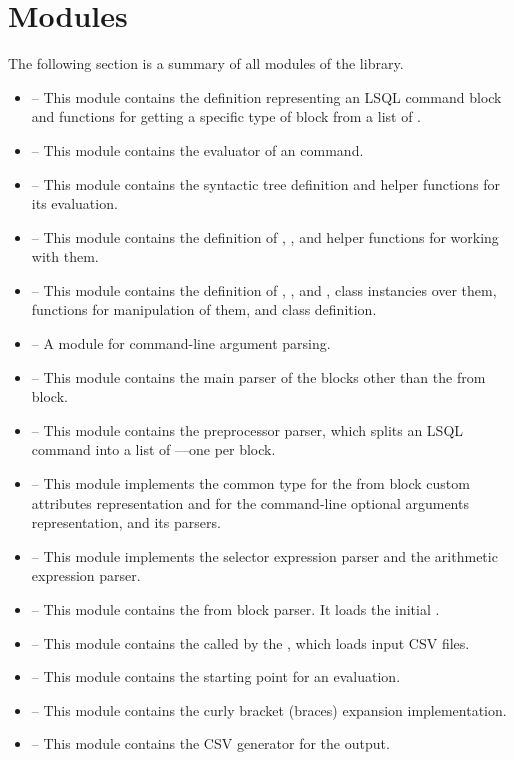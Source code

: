 \section{Modules}
The following section is a summary of all modules of the library.
\begin{itemize}
    \item {} -- This module contains the  definition representing an LSQL command block and functions for getting a specific type of block from a list of .
    \item {} -- This module contains the evaluator of an \break{} command.
    \item {} -- This module contains the syntactic tree definition and helper functions for its evaluation.
    \item {} -- This module contains the definition of , , and helper functions for working with them.
    \item {} -- This module contains the definition of , , and , class instancies over them, functions for manipulation of them, and  class definition.
    \item {} -- A module for command-line argument parsing.
    \item {} -- This module contains the main parser of the blo\-cks other than the from block.
    \item {} -- This module contains the preprocessor parser, which splits an LSQL command into a list of ---one  per block.
    \item {} -- This module implements the common  type for the from block custom attributes representation and for the co\-mmand-line optional arguments representation, and its parsers.
    \item {} -- This module implements the selector expression parser and the arithmetic expression parser.
    \item {} -- This module contains the from block parser. It loads the initial .
    \item {} -- This module contains the  called by the , which loads input CSV files.
    \item {} -- This module contains the starting point for an  evaluation.
    \item {} -- This module contains the curly bra\-cket (braces) expansion implementation.
    \item {} -- This module contains the CSV generator for the output.
\end{itemize}

